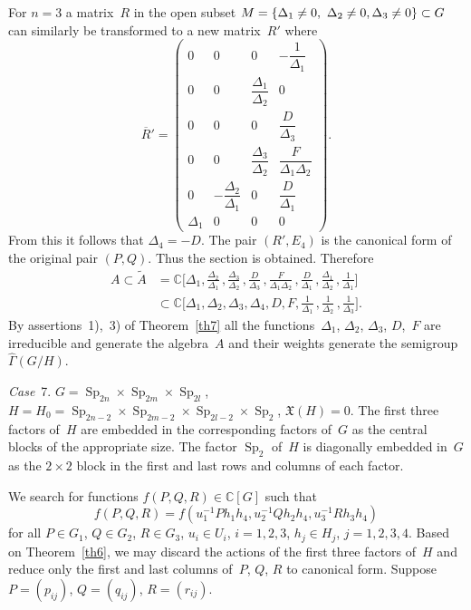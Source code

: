 \documentclass[12pt]{amsart}
\theoremstyle{definition}
\theoremstyle{remark}
\begin{document}
For $n=3$ a matrix~$R$ in the open subset $M=\{\Delta_1\ne0, \
\Delta_2\ne\nobreak0, \allowbreak \Delta_3\ne\nobreak0\}\subset G$
can similarly be transformed to a new matrix~$R'$ where
$$
\overline R{}'=\begin{pmatrix} 0 & 0 & 0 & -\dfrac{1}{\Delta_1}
\\
0 & 0 & \dfrac{\Delta_1}{\Delta_2} & 0
\\
0 & 0 & 0 & \dfrac{D}{\Delta_3}
\\[3mm]
0 & 0 & \dfrac{\Delta_3}{\Delta_2} & \dfrac{F}{\Delta_1\Delta_2}
\\[3mm]
0 & -\dfrac{\Delta_2}{\Delta_1} & 0 & \dfrac{D}{\Delta_1}
\\
\Delta_1 & 0 & 0 & 0
\end{pmatrix}.
$$
From this it follows that $\Delta_4=-D$. The pair $(R',E_4)$ is the
canonical form of the original pair $(P,Q)$. Thus the section is
obtained. Therefore
\begin{align*}
A\subset \tilde
A&=\mathbb{C}\biggl[\Delta_1,\frac{\Delta_2}{\Delta_1}\,,
\frac{\Delta_3}{\Delta_2}\,,\frac{D}{\Delta_3}\,,\frac{F}{\Delta_1\Delta_2}\,,
\frac{D}{\Delta_1}\,,\frac{\Delta_1}{\Delta_2}\,,\frac{1}{\Delta_1}\biggr]
\\
&\subset\mathbb{C}\biggl[\Delta_1,\Delta_2,\Delta_3,\Delta_4,D,F,
\frac{1}{\Delta_1}\,,\frac{1}{\Delta_2}\,,\frac{1}{\Delta_3}\biggr].
\end{align*}
By assertions~1),~3) of Theorem~\ref{th7} all the
functions~$\Delta_1$, $\Delta_2$, $\Delta_3$, $D$,~$F$ are
irreducible and generate the algebra~$A$ and their weights generate
the semigroup~$\widehat\Gamma(G/H)$.

\textsl{Case}~7. $G={\operatorname{Sp}}_{2n}\times {\operatorname{Sp}}_{2m}\times {\operatorname{Sp}}_{2l}$,
$H=H_0={\operatorname{Sp}}_{2n-2}\times {\operatorname{Sp}}_{2m-2}\times \allowbreak
{\operatorname{Sp}}_{2l-2}\times {\operatorname{Sp}}_2$, $\mathfrak{X}(H)=0$. The first three
factors of~$H$ are embedded in the corresponding factors of~$G$ as
the central blocks of the appropriate size. The factor ${\operatorname{Sp}}_2$
of~$H$ is diagonally embedded in~$G$ as the $2\times 2$ block in the
first and last rows and columns of each factor.

We search for functions $f(P,Q,R)\in \mathbb{C}[G]$ such that
$$
f(P,Q,R)=f(u_1^{-1}Ph_1h_4,u_2^{-1}Qh_2h_4,u_3^{-1}Rh_3h_4)
$$
for all $P\in G_1$, $Q\in G_2$, $R\in G_3$, $u_i\in U_i$, $i=1,2,3$,
$h_j\in H_j$, $j=1,2,3,4$. Based on Theorem~\ref{th6}, we may
discard the actions of the first three factors of~$H$ and reduce
only the first and last columns of~$P$, $Q$, $R$ to canonical form.
Suppose $P=(p_{ij})$, $Q=(q_{ij})$, $R=(r_{ij})$.
\end{document}
